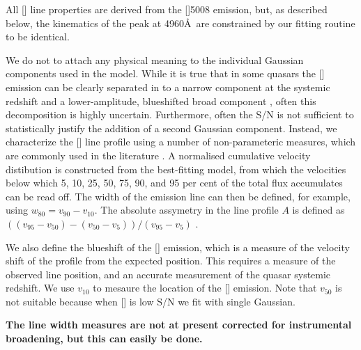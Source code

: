 All [] line properties are derived from the []5008 emission, but, as described below, the kinematics of the peak at 4960\AA\, are constrained by our fitting routine to be identical.

We do not to attach any physical meaning to the individual Gaussian components used in the model. 
While it is true that in some quasars the [] emission can be clearly separated in to a narrow component at the systemic redshift and a lower-amplitude, blueshifted broad component \citep[e.g.][]{shen16a}, often this decomposition is highly uncertain.
Furthermore, often the S/N is not sufficient to statistically justify the addition of a second Gaussian component.  
Instead, we characterize the [] line profile using a number of non-parameteric measures, which are commonly used in the literature \citep[e.g.][]{zakamska14,zakamska16}. 
A normalised cumulative velocity distibution is constructed from the best-fitting model, from which the velocities below which 5, 10, 25, 50, 75, 90, and 95 per cent of the total flux accumulates can be read off. 
The width of the emission line can then be defined, for example, using $w_{80} = v_{90} - v_{10}$. 
The absolute assymetry in the line profile $A$ is defined as $((v_{95} - v_{50}) - (v_{50} - v_{5})) / (v_{95} - v_{5})$ \citep{zakamska14}. 

We also define the blueshift of the [] emission, which is a measure of the velocity shift of the profile from the expected position. 
This requires a measure of the observed line position, and an accurate measurement of the quasar systemic redshift. 
We use $v_{10}$ to mesaure the location of the [] emission. 
Note that $v_{50}$ is not suitable because when [] is low S/N we fit with single Gaussian. 

{\bf The line width measures are not at present corrected for instrumental broadening, but this can easily be done.}

